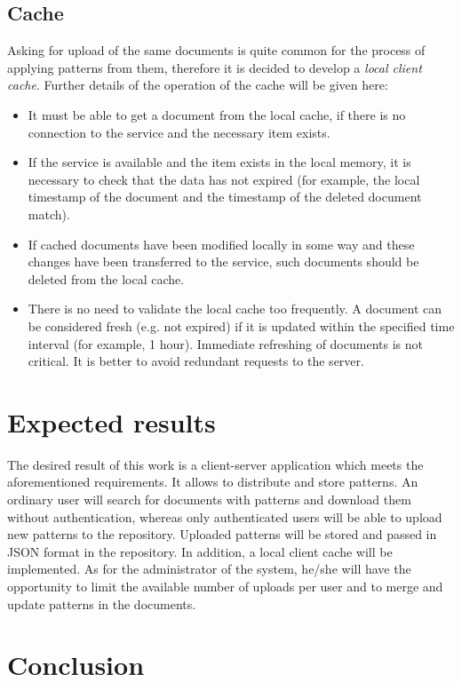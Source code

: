 \documentclass[letterpaper, 10 pt, conference]{ieeeconf}  %
\begin{document}
\subsection{Cache}
Asking for upload of the same documents is quite common for the process of
applying patterns from them, therefore it is decided to develop a 
\emph{local client cache}. 
Further details of the operation of the cache will be given here:
\begin{itemize}
    \item It must be able to get a document from the local cache, if there
    is no connection to the service and the necessary item exists.
    \item If the service is available and the item exists in the
    local memory, it is necessary to check that the data has not expired
    (for example, the local timestamp of the document and the timestamp of
    the deleted document match).
    \item If cached documents have been modified locally in some way
    and these changes have been transferred to the service, such documents
    should be deleted from the local cache.
    \item There is no need to validate the local cache too frequently.
    A document can be considered fresh (e.g. not expired) if it is
    updated within the specified time interval (for example, 1 hour).
    Immediate refreshing of documents is not critical. 
    It is better to avoid redundant requests to the server.
\end{itemize}

\section{Expected results}
\label{section:results}

The desired result of this work is a client-server application which
meets the aforementioned requirements. 
It allows to distribute and store patterns.
An ordinary user will search for documents with patterns and download them
without authentication, whereas only authenticated users will be able to 
upload new patterns to the repository. 
Uploaded patterns will be stored and passed in JSON format in the repository.
In addition, a local client cache will be implemented.
As for the administrator of the system, he/she will have the opportunity to
limit the available number of uploads per user and to merge and update 
patterns in the documents. 

\section{Conclusion}
\label{section:conclusion}
\end{document}
